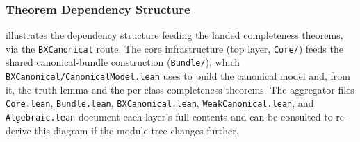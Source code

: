 \documentclass[../BimodalReference.tex]{subfiles}
\begin{document}
\subsubsection{Theorem Dependency Structure}

 illustrates the dependency structure feeding the landed completeness theorems, via the \texttt{BXCanonical} route.
The core infrastructure (top layer, \texttt{Core/}) feeds the shared canonical-bundle construction (\texttt{Bundle/}), which \texttt{BXCanonical/CanonicalModel.lean} uses to build the canonical model and, from it, the truth lemma and the per-class completeness theorems.
The aggregator files \texttt{Core.lean}, \texttt{Bundle.lean}, \texttt{BXCanonical.lean}, \texttt{WeakCanonical.lean}, and \texttt{Algebraic.lean} document each layer's full contents and can be consulted to re-derive this diagram if the module tree changes further.
\end{document}
